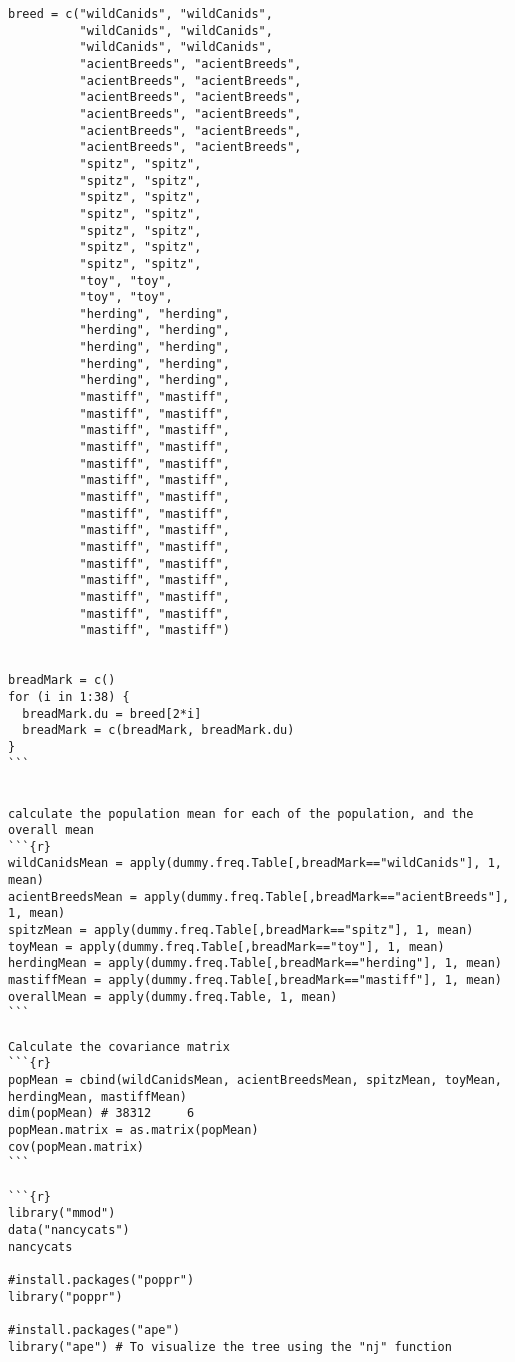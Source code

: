 \documentclass{article} %
\begin{document}
{\begin{verbatim}
breed = c("wildCanids", "wildCanids", 
          "wildCanids", "wildCanids",
          "wildCanids", "wildCanids",
          "acientBreeds", "acientBreeds",
          "acientBreeds", "acientBreeds",
          "acientBreeds", "acientBreeds",
          "acientBreeds", "acientBreeds", 
          "acientBreeds", "acientBreeds",
          "acientBreeds", "acientBreeds",
          "spitz", "spitz",
          "spitz", "spitz",
          "spitz", "spitz",
          "spitz", "spitz",
          "spitz", "spitz",
          "spitz", "spitz",
          "spitz", "spitz",
          "toy", "toy", 
          "toy", "toy", 
          "herding", "herding",
          "herding", "herding",
          "herding", "herding",
          "herding", "herding",
          "herding", "herding",
          "mastiff", "mastiff",
          "mastiff", "mastiff",
          "mastiff", "mastiff",
          "mastiff", "mastiff",
          "mastiff", "mastiff",
          "mastiff", "mastiff",
          "mastiff", "mastiff",
          "mastiff", "mastiff",
          "mastiff", "mastiff",
          "mastiff", "mastiff",
          "mastiff", "mastiff",
          "mastiff", "mastiff",
          "mastiff", "mastiff",
          "mastiff", "mastiff",
          "mastiff", "mastiff")


breadMark = c()
for (i in 1:38) {
  breadMark.du = breed[2*i]
  breadMark = c(breadMark, breadMark.du)
}
```


calculate the population mean for each of the population, and the overall mean
```{r}
wildCanidsMean = apply(dummy.freq.Table[,breadMark=="wildCanids"], 1, mean)
acientBreedsMean = apply(dummy.freq.Table[,breadMark=="acientBreeds"], 1, mean)
spitzMean = apply(dummy.freq.Table[,breadMark=="spitz"], 1, mean)
toyMean = apply(dummy.freq.Table[,breadMark=="toy"], 1, mean)
herdingMean = apply(dummy.freq.Table[,breadMark=="herding"], 1, mean)
mastiffMean = apply(dummy.freq.Table[,breadMark=="mastiff"], 1, mean)
overallMean = apply(dummy.freq.Table, 1, mean)
```

Calculate the covariance matrix 
```{r}
popMean = cbind(wildCanidsMean, acientBreedsMean, spitzMean, toyMean, herdingMean, mastiffMean)
dim(popMean) # 38312     6
popMean.matrix = as.matrix(popMean)
cov(popMean.matrix)
```

```{r}
library("mmod")
data("nancycats")
nancycats

#install.packages("poppr")
library("poppr")

#install.packages("ape")
library("ape") # To visualize the tree using the "nj" function


\end{verbatim}}
\end{document}

